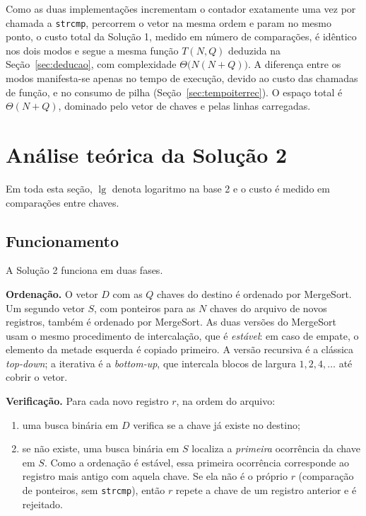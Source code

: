 \documentclass[11pt,a4paper]{article}
\begin{document}
Como as duas implementações incrementam o contador exatamente uma vez por chamada a \texttt{strcmp}, percorrem o vetor na mesma ordem e param no mesmo ponto, o custo total da Solução 1, medido em número de comparações, é idêntico nos dois modos e segue a mesma função $T(N,Q)$ deduzida na Seção~\ref{sec:deducao}, com complexidade $\Theta\big(N(N+Q)\big)$. A diferença entre os modos manifesta-se apenas no tempo de execução, devido ao custo das chamadas de função, e no consumo de pilha (Seção~\ref{sec:tempoiterrec}). O espaço total é $\Theta(N+Q)$, dominado pelo vetor de chaves e pelas linhas carregadas.

\section{Análise teórica da Solução 2}
\label{sec:sol2}

Em toda esta seção, $\lg$ denota logaritmo na base 2 e o custo é medido em comparações entre chaves.

\subsection{Funcionamento}

A Solução 2 funciona em duas fases.

\textbf{Ordenação.} O vetor $D$ com as $Q$ chaves do destino é ordenado por MergeSort. Um segundo vetor $S$, com ponteiros para as $N$ chaves do arquivo de novos registros, também é ordenado por MergeSort. As duas versões do MergeSort usam o mesmo procedimento de intercalação, que é \emph{estável}: em caso de empate, o elemento da metade esquerda é copiado primeiro. A versão recursiva é a clássica \emph{top-down}; a iterativa é a \emph{bottom-up}, que intercala blocos de largura $1,2,4,\ldots$ até cobrir o vetor.

\textbf{Verificação.} Para cada novo registro $r$, na ordem do arquivo:
\begin{enumerate}[itemsep=1pt]
  \item uma busca binária em $D$ verifica se a chave já existe no destino;
  \item se não existe, uma busca binária em $S$ localiza a \emph{primeira} ocorrência da chave em $S$. Como a ordenação é estável, essa primeira ocorrência corresponde ao registro mais antigo com aquela chave. Se ela não é o próprio $r$ (comparação de ponteiros, sem \texttt{strcmp}), então $r$ repete a chave de um registro anterior e é rejeitado.
\end{enumerate}
\end{document}
